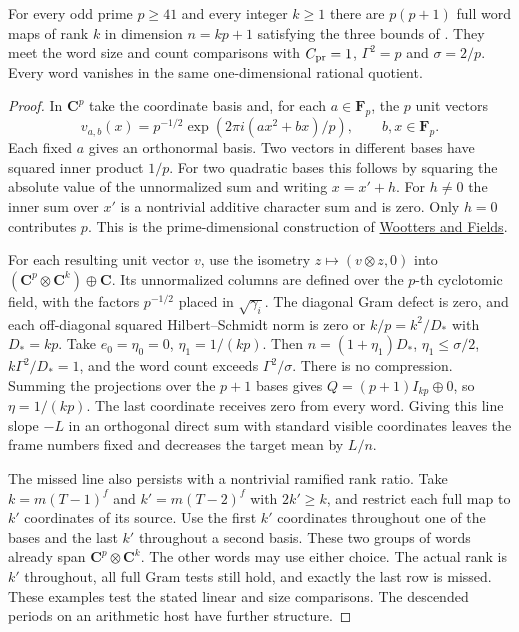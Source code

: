 \begin{proposition}\label{rank:blind}
For every odd prime \(p\ge41\) and every integer \(k\ge1\) there
are \(p(p+1)\) full word maps of rank \(k\) in dimension \(n=kp+1\)
satisfying the three bounds of . They meet the word
size and count comparisons with \(C_{\rm pr}=1\), \(\Gamma^2=p\)
and \(\sigma=2/p\). Every word vanishes in the same one-dimensional
rational quotient.
\end{proposition}
\begin{proof}
In \(\mathbf C^p\) take the coordinate basis and, for each
\(a\in\mathbf F_p\), the \(p\) unit vectors
\[
 v_{a,b}(x)=p^{-1/2}\exp(2\pi i(ax^2+bx)/p),
                       \qquad b,x\in\mathbf F_p .
\]
Each fixed \(a\) gives an orthonormal basis. Two vectors in different
bases have squared inner product \(1/p\). For two quadratic bases
this follows by squaring the absolute value of the unnormalized
sum and writing \(x=x'+h\). For \(h\ne0\) the inner sum over \(x'\)
is a nontrivial additive character sum and is zero. Only \(h=0\)
contributes \(p\). This is the prime-dimensional construction of
\href{https://doi.org/10.1016/0003-4916(89)90322-9}{Wootters and Fields}.

For each resulting unit vector \(v\), use the isometry
\(z\mapsto(v\otimes z,0)\) into
\((\mathbf C^p\otimes\mathbf C^k)\oplus\mathbf C\).
Its unnormalized columns are defined over the \(p\)-th cyclotomic
field, with the factors \(p^{-1/2}\) placed in \(\sqrt{\gamma_i}\).
The diagonal Gram defect is zero, and each off-diagonal squared
Hilbert--Schmidt norm is zero or \(k/p=k^2/D_*\) with \(D_*=kp\).
Take \(e_0=\eta_0=0\), \(\eta_1=1/(kp)\). Then
\(n=(1+\eta_1)D_*\), \(\eta_1\le\sigma/2\),
\(k\Gamma^2/D_*=1\), and the word count exceeds
\(\Gamma^2/\sigma\). There is no compression. Summing the projections
over the \(p+1\) bases gives \(Q=(p+1)I_{kp}\oplus0\), so
\(\eta=1/(kp)\). The last coordinate receives zero from every word.
Giving this line slope \(-L\) in an orthogonal direct sum with
standard visible coordinates leaves the frame numbers fixed and
decreases the target mean by \(L/n\).

The missed line also persists with a nontrivial ramified rank
ratio. Take \(k=m(T-1)^f\) and \(k'=m(T-2)^f\) with \(2k'\ge k\),
and restrict each full map to \(k'\) coordinates of its source.
Use the first \(k'\) coordinates throughout one of the bases and
the last \(k'\) throughout a second basis. These two groups of
words already span \(\mathbf C^p\otimes\mathbf C^k\). The other
words may use either choice. The actual rank is \(k'\) throughout,
all full Gram tests still hold, and exactly the last row is missed.
These examples test the stated linear and size comparisons. The
descended periods on an arithmetic host have further structure.
\end{proof}

